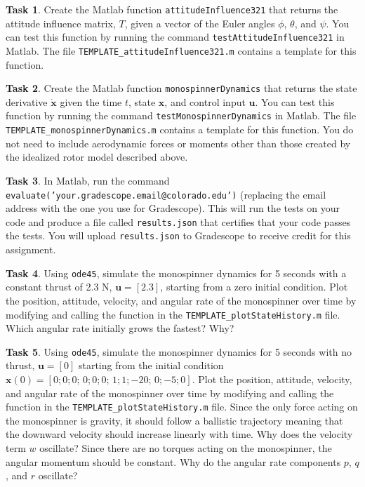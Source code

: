 \documentclass{article}
\theoremstyle{definition}
\newtheorem{task}{Task}
\begin{document}
\begin{task}
    Create the Matlab function \texttt{attitudeInfluence321} that returns the attitude influence matrix, $T$, given a vector of the Euler angles $\phi$, $\theta$, and $\psi$. You can test this function by running the command \texttt{testAttitudeInfluence321} in Matlab. The file \texttt{TEMPLATE\_attitudeInfluence321.m} contains a template for this function.
\end{task}

\begin{task}
    Create the Matlab function \texttt{monospinnerDynamics} that returns the state derivative $\dot{\textbf{x}}$ given the time $t$, state $\textbf{x}$, and control input $\textbf{u}$. You can test this function by running the command \texttt{testMonospinnerDynamics} in Matlab. The file \texttt{TEMPLATE\_monospinnerDynamics.m} contains a template for this function. You do not need to include aerodynamic forces or moments other than those created by the idealized rotor model described above.
\end{task}

\begin{task}
    In Matlab, run the command \texttt{evaluate('your.gradescope.email@colorado.edu')} (replacing the email address with the one you use for Gradescope). This will run the tests on your code and produce a file called \texttt{results.json} that certifies that your code passes the tests. You will upload \texttt{results.json} to Gradescope to receive credit for this assignment.
\end{task}

\begin{task}\label{task:powered}
    Using \texttt{ode45}, simulate the monospinner dynamics for 5 seconds with a constant thrust of 2.3 N, $\textbf{u}=[2.3]$, starting from a zero initial condition. Plot the position, attitude, velocity, and angular rate of the monospinner over time by modifying and calling the function in the \texttt{TEMPLATE\_plotStateHistory.m} file. Which angular rate initially grows the fastest? Why?
\end{task}

\begin{task}\label{task:ballistic}
    Using \texttt{ode45}, simulate the monospinner dynamics for 5 seconds with no thrust, $\textbf{u}=[0]$ starting from the initial condition $\textbf{x}(0) = [0; 0; 0;\,  0; 0; 0;\, 1; 1; -20;\, 0; -5; 0]$. Plot the position, attitude, velocity, and angular rate of the monospinner over time by modifying and calling the function in the \texttt{TEMPLATE\_plotStateHistory.m} file. Since the only force acting on the monospinner is gravity, it should follow a ballistic trajectory meaning that the downward velocity should increase linearly with time. Why does the velocity term $w$ oscillate? Since there are no torques acting on the monospinner, the angular momentum should be constant. Why do the angular rate components $p$, $q$, and $r$ oscillate?
\end{task}
\end{document}
